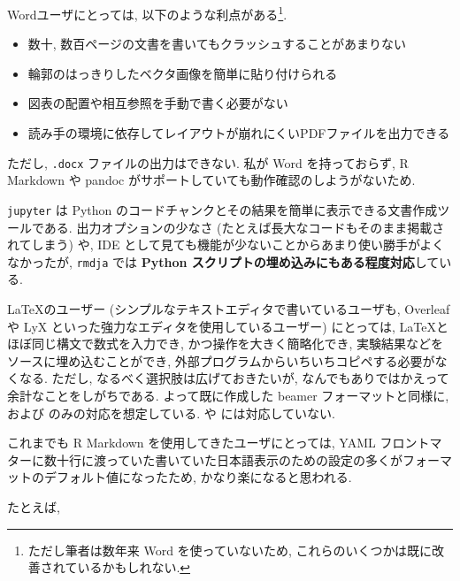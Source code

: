 \documentclass[
  xelatex,ja=standard,jafont=noto]{bxjsbook}
\providecommand{\tightlist}{%
  \setlength{\itemsep}{0pt}\setlength{\parskip}{0pt}}
\theoremstyle{definition}
\theoremstyle{definition}
\theoremstyle{definition}
\theoremstyle{definition}
\theoremstyle{remark}
\begin{document}
Wordユーザにとっては, 以下のような利点がある\footnote{ただし筆者は数年来
  Word を使っていないため,
  これらのいくつかは既に改善されているかもしれない.}.

\begin{itemize}
\tightlist
\item
  数十, 数百ページの文書を書いてもクラッシュすることがあまりない
\item
  輪郭のはっきりしたベクタ画像を簡単に貼り付けられる
\item
  図表の配置や相互参照を手動で書く必要がない
\item
  読み手の環境に依存してレイアウトが崩れにくいPDFファイルを出力できる
\end{itemize}

ただし, \texttt{.docx} ファイルの出力はできない. 私が Word
を持っておらず, R Markdown や pandoc
がサポートしていても動作確認のしようがないため.

\texttt{jupyter} は Python
のコードチャンクとその結果を簡単に表示できる文書作成ツールである.
出力オプションの少なさ (たとえば長大なコードもそのまま掲載されてしまう)
や, IDE として見ても機能が少ないことからあまり使い勝手がよくなかったが,
\texttt{rmdja} では \textbf{Python
スクリプトの埋め込みにもある程度対応}している.

\LaTeX のユーザー (シンプルなテキストエディタで書いているユーザも,
Overleaf や LyX といった強力なエディタを使用しているユーザー)
にとっては, \LaTeX とほぼ同じ構文で数式を入力でき,
かつ操作を大きく簡略化でき, 実験結果などをソースに埋め込むことができ,
外部プログラムからいちいちコピペする必要がなくなる. ただし,
なるべく選択肢は広げておきたいが,
なんでもありではかえって余計なことをしがちである. よって既に作成した
beamer フォーマットと同様に, \XeLaTeX および
\LuaLaTeX のみの対応を想定している. \pLaTeX や
\upLaTeX には対応していない.

これまでも R Markdown を使用してきたユーザにとっては, YAML
フロントマターに数十行に渡っていた書いていた日本語表示のための設定の多くがフォーマットのデフォルト値になったため,
かなり楽になると思われる.

たとえば,
\end{document}
